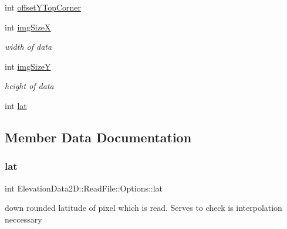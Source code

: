 \begin{DoxyCompactItemize}
int \mbox{\hyperlink{structElevationData2D_1_1ReadFile_1_1Options_a303441c192b00be0a49a3d83d6c09200}{offset\+Y\+Top\+Corner}}
\item 
\mbox{\label{structElevationData2D_1_1ReadFile_1_1Options_ab26c64d16fb851be32a9125a411f26e8}} 
int \mbox{\hyperlink{structElevationData2D_1_1ReadFile_1_1Options_ab26c64d16fb851be32a9125a411f26e8}{img\+SizeX}}
\begin{DoxyCompactList}\small\item\em width of data \end{DoxyCompactList}\item 
\mbox{\label{structElevationData2D_1_1ReadFile_1_1Options_af5b78d2e15389a9dce0ab574e48e25bf}} 
int \mbox{\hyperlink{structElevationData2D_1_1ReadFile_1_1Options_af5b78d2e15389a9dce0ab574e48e25bf}{img\+SizeY}}
\begin{DoxyCompactList}\small\item\em height of data \end{DoxyCompactList}\item 
int \mbox{\hyperlink{structElevationData2D_1_1ReadFile_1_1Options_a492ba62bf5f3194ae388aedb2c0c7e6b}{lat}}
\end{DoxyCompactItemize}


\subsection{Member Data Documentation}
\mbox{\label{structElevationData2D_1_1ReadFile_1_1Options_a492ba62bf5f3194ae388aedb2c0c7e6b}} 
\subsubsection{\texorpdfstring{lat}{lat}}
{\footnotesize\ttfamily int Elevation\+Data2\+D\+::\+Read\+File\+::\+Options\+::lat}

down rounded latitude of pixel which is read. Serves to check is interpolation neccessary \mbox{\label{structElevationData2D_1_1ReadFile_1_1Options_a43a20cc28c6d9e708b2fbfcbb269d7ff}} 
